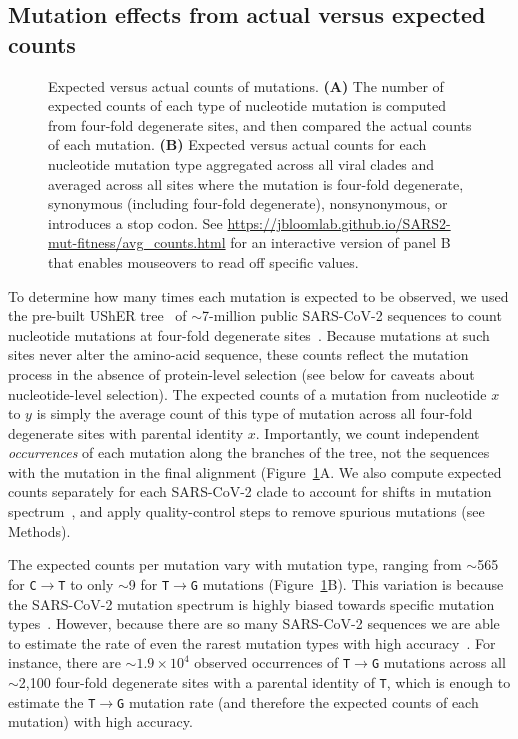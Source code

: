 \documentclass[9pt,twocolumn,twoside]{gsajnl_modified}
\begin{document}
\subsection{Mutation effects from actual versus expected counts}

\begin{figure}
\caption{
Expected versus actual counts of mutations.
{\bf (A)}
The number of expected counts of each type of nucleotide mutation is computed from four-fold degenerate sites, and then compared the actual counts of each mutation.
{\bf (B)}
Expected versus actual counts for each nucleotide mutation type aggregated across all viral clades and averaged across all sites where the mutation is four-fold degenerate, synonymous (including four-fold degenerate), nonsynonymous, or introduces a stop codon.
See \url{https://jbloomlab.github.io/SARS2-mut-fitness/avg_counts.html} for an interactive version of panel B that enables mouseovers to read off specific values.
\label{fig:expected_vs_actual}
}
\end{figure}

To determine how many times each mutation is expected to be observed, we used the pre-built UShER tree~\citep{mcbroome2021daily,turakhia2021ultrafast,lanfear2020} of $\sim$7-million public SARS-CoV-2 sequences to count nucleotide mutations at four-fold degenerate sites~\citep[Figure~\ref{fig:expected_vs_actual}A;][]{bloom2023evolution}.
Because mutations at such sites never alter the amino-acid sequence, these counts reflect the mutation process in the absence of protein-level selection (see below for caveats about nucleotide-level selection).
The expected counts of a mutation from nucleotide $x$ to $y$ is simply the average count of this type of mutation across all four-fold degenerate sites with parental identity $x$.
Importantly, we count independent \emph{occurrences} of each mutation along the branches of the tree, not the sequences with the mutation in the final alignment (Figure~\ref{fig:expected_vs_actual}A.
We also compute expected counts separately for each SARS-CoV-2 clade to account for shifts in mutation spectrum~\citep{bloom2023evolution,ruis2022mutational}, and apply quality-control steps to remove spurious mutations (see Methods).

The expected counts per mutation vary with mutation type, ranging from $\sim$565 for \texttt{C$\rightarrow$T} to only $\sim$9 for \texttt{T$\rightarrow$G} mutations (Figure~\ref{fig:expected_vs_actual}B).
This variation is because the SARS-CoV-2 mutation spectrum is highly biased towards specific mutation types~\citep{bloom2023evolution,ruis2022mutational,de2021mutation,neher2022contributions}.
However, because there are so many SARS-CoV-2 sequences we are able to estimate the rate of even the rarest mutation types with high accuracy~\cite{bloom2023evolution}.
For instance, there are $\sim 1.9\times 10^4$ observed occurrences of \texttt{T$\rightarrow$G} mutations across all $\sim$2,100 four-fold degenerate sites with a parental identity of \texttt{T}, which is enough to estimate the \texttt{T$\rightarrow$G} mutation rate (and therefore the expected counts of each mutation) with high accuracy.
\end{document}
